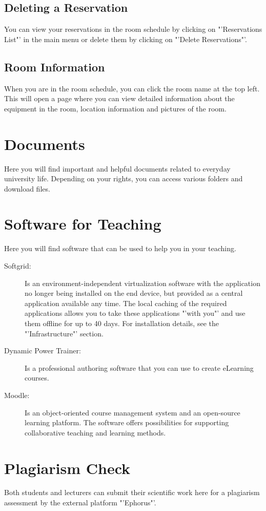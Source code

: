 
\subsection{Deleting a Reservation}

You can view your reservations in the room schedule by clicking on "'Reservations List"' in the main menu or delete them by clicking on "'Delete Reservations"'.

\subsection{Room Information}

When you are in the room schedule, you can click the room name at the top left.
This will open a page where you can view detailed information about the equipment in the room, location information and pictures of the room.

\section{Documents}

Here you will find important and helpful documents related to everyday university life. Depending on your rights, you can access various folders and download files.

\section{Software for Teaching}

Here you will find software that can be used to help you in your teaching.

\begin{description}
	\item [Softgrid:] Is an environment-independent virtualization software with the application no longer being installed on the end device, but provided as a central application available any time. The local caching of the required applications allows you to take these applications "'with you"' and use them offline for up to 40 days. For installation details, see the "'Infrastructure"' section.
	\item [Dynamic Power Trainer:] Is a professional authoring software that you can use to create eLearning courses.
	\item [Moodle:] Is an object-oriented course management system and an open-source learning platform. The software offers possibilities for supporting collaborative teaching and learning methods.
\end{description}

\section{Plagiarism Check}

Both students and lecturers can submit their scientific work here for a plagiarism assessment by the external platform "'Ephorus"'.